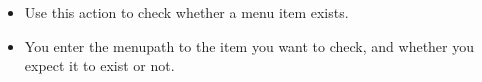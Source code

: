 \begin{itemize}
\item Use this action to check whether a menu item exists.
\item You enter the menupath to the item you want to check, and whether you expect it to exist or not. 
\end{itemize}

